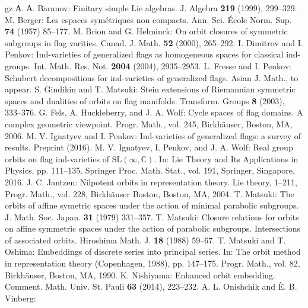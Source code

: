 \documentclass{amsart}
\theoremstyle{definition}
\begin{document}
\begin{thebibliography}{gz}
 А. А. Baranov: Finitary simple Lie algebras.  J. Algebra \textbf{219} (1999), 299--329.
 M. Berger: Les espaces sym\'etriques non compacts. Ann. Sci. \'Ecole Norm. Sup. \textbf{74} (1957) 85--177.
 M. Brion and G. Helminck: On orbit closures of symmetric subgroups in flag varities. Canad. J. Math. \textbf{52} (2000), 265--292.
 I. Dimitrov and I. Penkov: Ind-varieties of generalized flags as homogeneous spaces for classical ind-groups. Int. Math. Res. Not. \textbf{2004} (2004), 2935--2953.
 L. Fresse and I. Penkov: Schubert decompositions for ind-varieties of generalized flags. Asian J. Math., to appear.
 S. Gindikin and T. Matsuki: Stein extensions of Riemannian symmetric spaces and dualities of orbits on flag manifolds. Transform. Groups \textbf{8} (2003), 333--376.
 G. Fels, A. Huckleberry, and J. A. Wolf: Cycle spaces of flag domains. A complex geometric viewpoint. Progr. Math., vol. 245, Birkh\"auser, Boston, MA, 2006.
 M. V. Ignatyev and I. Penkov: Ind-varieties of generalized flags: a survey of results. Preprint (2016).
 M. V. Ignatyev, I. Penkov, and J. A. Wolf: Real group orbits on flag ind-varieties of $\mathrm{SL}(\infty,\mathbb{C})$. In: Lie Theory and Its Applications in Physics, pp. 111--135. Springer Proc. Math. Stat., vol. 191, Springer, Singapore, 2016.
  J. C. Jantzen: Nilpotent orbits in representation theory. Lie theory, 1--211, Progr. Math., vol. 228, Birkh\"auser Boston, Boston, MA, 2004.
 T. Matsuki: The orbits of affine symetric spaces under the action of minimal parabolic
subgroups. J. Math. Soc. Japan. \textbf{31} (1979) 331--357.
 T. Matsuki: Closure relations for orbits on affine symmetric spaces under the action of parabolic subgroups. Intersections of associated orbits. Hiroshima Math. J. \textbf{18} (1988) 59--67.
 T. Matsuki and T. Oshima:
Embeddings of discrete series into principal series.
In: The orbit method in representation theory (Copenhagen, 1988), pp. 147--175.
Progr. Math., vol. 82, Birkh\"auser, Boston, MA, 1990.
 K. Nishiyama: Enhanced orbit embedding.
Comment. Math. Univ. St. Pauli \textbf{63} (2014), 223--232.
 A. L. Onishchik and \`E. B. Vinberg:

\end{thebibliography}
\end{document}
